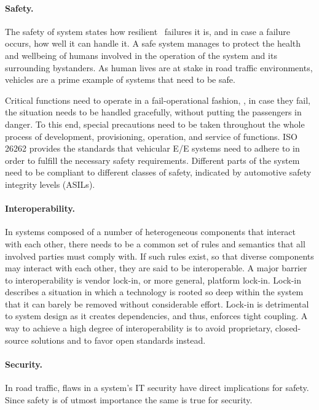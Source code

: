 \paragraph{Safety.}
The safety of system states how resilient \wrt\ failures it is, and in case a failure occurs, how well it can handle it. A safe system manages to protect the health and wellbeing of humans involved in the operation of the system and its surrounding bystanders.
As human lives are at stake in road traffic environments, vehicles are a prime example of systems that need to be safe.

Critical functions need to operate in a fail-operational fashion, \ie , in case they fail, the situation needs to be handled gracefully, without putting the passengers in danger. To this end, special precautions need to be taken throughout the whole process of development, provisioning, operation, and service of functions. ISO 26262 provides the standards that vehicular E/E systems need to adhere to in order to fulfill the necessary safety requirements. Different parts of the system need to be compliant to different classes of safety, indicated by automotive safety integrity levels (ASILs).

\paragraph{Interoperability.} 
In systems composed of a number of heterogeneous components that interact with each other, there needs to be a common set of rules and semantics that all involved parties must comply with. If such rules exist, so that diverse components may interact with each other, they are said to be interoperable.
A major barrier to interoperability is vendor lock-in, or more general, platform lock-in. Lock-in describes a situation in which a technology is rooted so deep within the system that it can barely be removed without considerable effort. Lock-in is detrimental to system design as it creates dependencies, and thus, enforces tight coupling. A way to achieve a high degree of interoperability is to avoid proprietary, closed-source solutions and to favor open standards instead.


\paragraph{Security.}
In road traffic, flaws in a system's IT security have direct implications for safety. Since safety is of utmost importance the same is true for security. 

